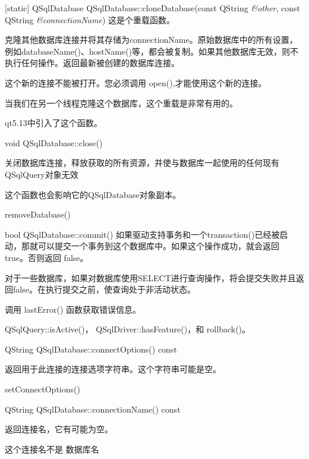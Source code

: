 [static] QSqlDatabase QSqlDatabase::cloneDatabase(const QString \emph{\&other}, const QString \emph{\&connectionName})
这是个重载函数。

克隆其他数据库连接并将其存储为connectionName。原始数据库中的所有设置，例如databaseName()、hostName()等，都会被复制。如果其他数据库无效，则不执行任何操作。返回最新被创建的数据库连接。



\begin{notice}
这个新的连接不能被打开。您必须调用 open(),才能使用这个新的连接。
\end{notice}

当我们在另一个线程克隆这个数据库，这个重载是非常有用的。

qt5.13中引入了这个函数。

void QSqlDatabase::close()

关闭数据库连接，释放获取的所有资源，并使与数据库一起使用的任何现有QSqlQuery对象无效

这个函数也会影响它的QSqlDatabase对象副本。




\begin{seeAlso}
removeDatabase()
\end{seeAlso}


bool QSqlDatabase::commit()
如果驱动支持事务和一个transaction()已经被启动，那就可以提交一个事务到这个数据库中。如果这个操作成功，就会返回 true。否则返回 false。


\begin{notice}
对于一些数据库，如果对数据库使用SELECT进行查询操作，将会提交失败并且返回false。在执行提交之前，使查询处于非活动状态。
\end{notice} 

调用 lastError() 函数获取错误信息。

\begin{seeAlso}
 QSqlQuery::isActive()， QSqlDriver::hasFeature()，和 rollback()。
\end{seeAlso}


QString QSqlDatabase::connectOptions() const

返回用于此连接的连接选项字符串。这个字符串可能是空。


\begin{seeAlso}
setConnectOptions()
\end{seeAlso}

QString QSqlDatabase::connectionName() const

返回连接名，它有可能为空。


\begin{notice}
这个连接名不是 数据库名
\end{notice}

